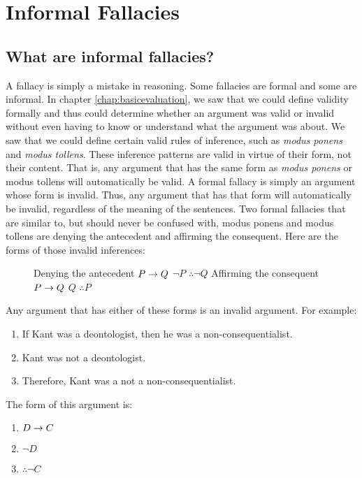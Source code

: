 \chapter{Informal Fallacies}
\label{chap:informalfallacies}
\setlength{\parindent}{1em}

\section{What are informal fallacies?}

A fallacy is simply a mistake in reasoning. Some fallacies are formal and some are informal. In chapter \ref{chap:basicevaluation}, we saw that we could define validity formally and thus could determine whether an argument was valid or invalid without even having to know or understand what the argument was about. We saw that we could define certain valid rules of inference, such as \textit{modus ponens} and \textit{modus tollens}. These inference patterns are valid in virtue of their form, not their content. That is, any argument that has the same form as \textit{modus ponens} or modus tollens will automatically be valid. A formal fallacy is simply an argument whose form is invalid. Thus, any argument that has that form will automatically be invalid, regardless of the meaning of the sentences. Two formal fallacies that are similar to, but should never be confused with, modus ponens and modus tollens are denying the antecedent and affirming the consequent. Here are the forms of those invalid inferences:

\begin{figure}
\begin{multicols}{2}
Denying the antecedent
$P \mathrel{\rightarrow} Q$
$\lnot P$
$\therefore \lnot Q$
Affirming the consequent
$P \mathrel{\rightarrow} Q$
$Q$
$\therefore P$
\end{multicols}
\end{figure}

Any argument that has either of these forms is an invalid argument. For example:
\begin{enumerate}
\item If Kant was a deontologist, then he was a non-consequentialist.
\item Kant was not a deontologist.
\item Therefore, Kant was a not a non-consequentialist.
\end{enumerate}

The form of this argument is:
\begin{enumerate}
\item $D \mathrel{\rightarrow} C$
\item $\lnot D$
\item $\therefore\lnot C$
\end{enumerate}

